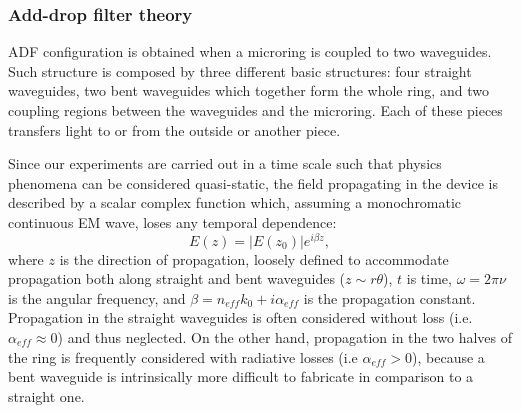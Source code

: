 \subsubsection{Add-drop filter theory}
\label{sssec:Add-drop_filter_theory}
ADF configuration is obtained when a microring is coupled to two waveguides.
Such structure is composed by three different basic structures: four straight waveguides, two bent waveguides which together form the whole ring, and two coupling regions between the waveguides and the microring.
Each of these pieces transfers light to or from the outside or another piece.

Since our experiments are carried out in a time scale such that physics phenomena can be considered quasi-static, the field propagating in the device is described by a scalar complex function which, assuming a monochromatic continuous EM wave, loses any temporal dependence:
\begin{equation}
	E(z) = |E(z_0)|e^{i\beta z},
\end{equation}
where $z$ is the direction of propagation, loosely defined to accommodate propagation both along straight and bent waveguides ($z\sim r\theta$), $t$ is time, $\omega=2\pi\nu$ is the angular frequency, and $\beta = n_{eff}k_0+i\alpha_{eff}$ is the propagation constant.
Propagation in the straight waveguides is often considered without loss (i.e. $\alpha_{eff}\approx 0$) and thus neglected.
On the other hand, propagation in the two halves of the ring is frequently considered with radiative losses (i.e $\alpha_{eff}> 0$), because a bent waveguide is intrinsically more difficult to fabricate in comparison to a straight one.

